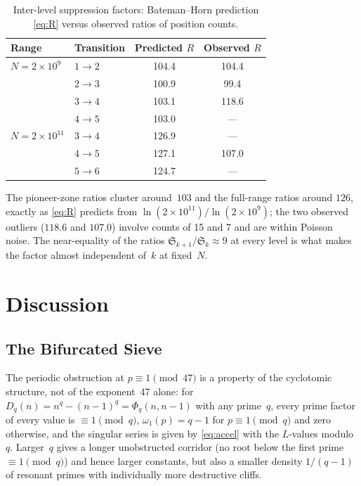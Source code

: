 ﻿\documentclass[11pt,a4paper]{article}
\newcommand{\Sk}[1]{\mathfrak{S}_{#1}}
\begin{document}
\begin{table}[H]
\centering
\caption{Inter-level suppression factors: Bateman--Horn prediction \eqref{eq:R}
versus observed ratios of position counts.}\label{tab:suppression}
\smallskip
\begin{tabular}{llcc}
\toprule
Range & Transition & Predicted $R$ & Observed $R$ \\
\midrule
$N = 2\times10^{9}$  & $1 \to 2$ & 104.4 & 104.4 \\
                     & $2 \to 3$ & 100.9 &  99.4 \\
                     & $3 \to 4$ & 103.1 & 118.6 \\
                     & $4 \to 5$ & 103.0 & --- \\
$N = 2\times10^{11}$ & $3 \to 4$ & 126.9 & --- \\
                     & $4 \to 5$ & 127.1 & 107.0 \\
                     & $5 \to 6$ & 124.7 & --- \\
\bottomrule
\end{tabular}
\end{table}

The pioneer-zone ratios cluster around~$103$ and the full-range ratios around
$126$, exactly as \eqref{eq:R} predicts from $\ln(2\times10^{11})/\ln(2\times10^{9})$;
the two observed outliers ($118.6$ and $107.0$) involve counts of 15 and 7 and
are within Poisson noise.  The near-equality of the ratios
$\Sk{k+1}/\Sk{k} \approx 9$ at every level is what makes the factor almost
independent of~$k$ at fixed~$N$.

\section{Discussion}

\subsection{The Bifurcated Sieve}

The periodic obstruction at $p \equiv 1 \pmod{47}$ is a property of the
cyclotomic structure, not of the exponent~47 alone: for
$D_q(n) = n^q - (n{-}1)^q = \Phi_q(n, n{-}1)$ with any prime~$q$, every prime
factor of every value is $\equiv 1 \pmod q$, $\omega_1(p) = q - 1$ for
$p \equiv 1 \pmod q$ and zero otherwise, and the singular series is given by
\eqref{eq:accel} with the $L$-values modulo~$q$.  Larger~$q$ gives a longer
unobstructed corridor (no root below the first prime $\equiv 1 \pmod q$) and
hence larger constants, but also a smaller density $1/(q{-}1)$ of resonant
primes with individually more destructive cliffs.
\end{document}
